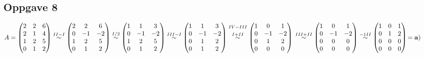\documentclass{article}
\newcommand{\vect}[1]{\begin{pmatrix} #1 \end{pmatrix}}
\newcommand{\eqqto}[1]{\overset{\substack{#1}}{\sim}}
\begin{document}
\subsection*{Oppgave 8}
\(
A = \vect{2&2&6 \\ 2&1&4 \\ 1&2&5 \\ 0&1&2}
\eqqto{II-I}
\vect{2&2&6 \\ 0&-1&-2 \\ 1&2&5 \\ 0&1&2}
\eqqto{I/2}
\vect{1&1&3 \\ 0&-1&-2 \\ 1&2&5 \\ 0&1&2}
\eqqto{III-I}
\vect{1&1&3 \\ 0&-1&-2 \\ 0&1&2 \\ 0&1&2}
\eqqto{IV-III\\\\I+II}
\vect{1&0&1 \\ 0&-1&-2 \\ 0&1&2 \\ 0&0&0}
\\\\\\
\eqqto{III+II}
\vect{1&0&1 \\ 0&-1&-2 \\ 0&0&0 \\ 0&0&0}
\eqqto{-1II}
\vect{1&0&1 \\ 0&1&2 \\ 0&0&0 \\ 0&0&0}
\mathbf{ = a)}\)
\\\\\\


\newpage
\end{document}
